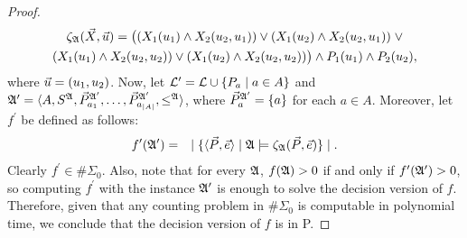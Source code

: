 \begin{proof}
\begin{multline*}
\zeta_{\frak A}(\vec{X},\vec{u}) = \big((X_1(u_1) \wedge X_2(u_2,u_1)  ) \vee (X_1(u_2) \wedge  X_2(u_2,u_1) )\; \vee \\ 
(X_1(u_1) \wedge  X_2(u_2,u_2)  ) \vee (X_1(u_2) \wedge  X_2(u_2,u_2)  )\big) \wedge P_1(u_1) \wedge P_2(u_2),
\end{multline*}
where $\vec{u} = (u_1,u_2)$. Now, let ${\cal L}^\prime = {\cal L} \cup \{P_a\mid a\in A\}$ and ${\frak A}^\prime = \langle A,S^{\frak A}, \vec{P}^{{\frak A}^\prime}_{a_1},\ldots,\vec{P}^{{\frak A}^\prime}_{a_{\vert A \vert}}, \leq^{\frak A} \rangle$, where $\vec{P}^{{\frak A}^\prime}_a = \{a\}$ for each $a\in A$. Moreover, let $f^\prime$ be defined as follows:
\begin{eqnarray*}
f^\prime({\frak A}^\prime) &=& \mid \{ \langle\vec{P},\vec{e}\rangle \mid {\frak A} \models \zeta_{\frak A}(\vec{P},\vec{e}) \} \mid.
\end{eqnarray*}
Clearly $f^\prime \in\#\Sigma_0$. Also, note that for every ${\frak A}$, $f({\frak A}) > 0$ if and only if $f^\prime({\frak A}^\prime) > 0$, so computing $f^\prime$ with the instance ${\frak A}^\prime$ is enough to solve the decision version of $f$. Therefore, given that any counting problem in $\#\Sigma_0$ is computable in polynomial time\cite{DBLP:journals/jcss/SalujaST95}, we conclude that the decision version of $f$ is in {\sc P}.
\end{proof}